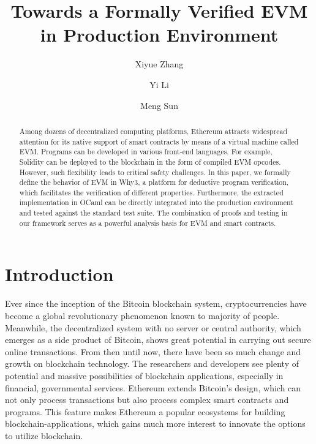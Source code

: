 \documentclass[runningheads]{llncs}
\begin{document}
%
\title{Towards a Formally Verified EVM in Production Environment}
%
%
\author{Xiyue Zhang \and
Yi Li \and
Meng Sun
}
%
%
%
\maketitle              %
%
\begin{abstract}
Among dozens of decentralized computing platforms, Ethe\-reum attracts widespread attention for its native support of smart contracts by means of a virtual machine called EVM. Programs can be developed in various front-end languages. For example, Solidity can be deployed to the blockchain in the form of compiled EVM opcodes. However, such flexibility leads to critical safety challenges. In this paper, we formally define the behavior of EVM in Why3, a platform for deductive program verification, which facilitates the verification of different properties. Furthermore, the extracted implementation in OCaml can be directly integrated into the production environment and tested against the standard test suite. The combination of proofs and testing in our framework serves as a powerful analysis basis for EVM and smart contracts.

\end{abstract}
%
%
%
\section{Introduction}
Ever since the inception of the Bitcoin \cite{nakamoto2008bitcoin} blockchain system, cryptocurrencies have become a global revolutionary phenomenon known to majority of people. Meanwhile, the decentralized system with no server or central authority, which emerges as a side product of Bitcoin, shows great potential in carrying out secure online transactions. From then until now, there have been so much change and growth on blockchain technology. The researchers and developers see plenty of potential and massive possibilities of blockchain applications, especially in financial, governmental services. Ethereum\cite{Ethereum} extends Bitcoin's design, which can not only process transactions but also process complex smart contracts and programs. This feature makes Ethereum a popular ecosystems for building blockchain-applications, which gains much more interest to innovate the options to utilize blockchain.
\end{document}
